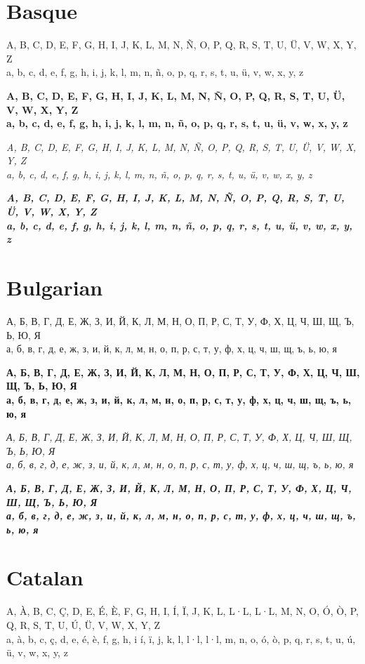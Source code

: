 \documentclass[12pt]{article}
\begin{document}
\section{Basque}
A, B, C, D, E, F, G, H, I, J, K, L, M, N, Ñ, O, P, Q, R, S, T, U, Ü, V, W, X, Y, Z \\
a, b, c, d, e, f, g, h, i, j, k, l, m, n, ñ, o, p, q, r, s, t, u, ü, v, w, x, y, z

\textbf {
A, B, C, D, E, F, G, H, I, J, K, L, M, N, Ñ, O, P, Q, R, S, T, U, Ü, V, W, X, Y, Z \\
a, b, c, d, e, f, g, h, i, j, k, l, m, n, ñ, o, p, q, r, s, t, u, ü, v, w, x, y, z
}

\textit{
A, B, C, D, E, F, G, H, I, J, K, L, M, N, Ñ, O, P, Q, R, S, T, U, Ü, V, W, X, Y, Z \\
a, b, c, d, e, f, g, h, i, j, k, l, m, n, ñ, o, p, q, r, s, t, u, ü, v, w, x, y, z
}

\textbf{\textit{
A, B, C, D, E, F, G, H, I, J, K, L, M, N, Ñ, O, P, Q, R, S, T, U, Ü, V, W, X, Y, Z \\
a, b, c, d, e, f, g, h, i, j, k, l, m, n, ñ, o, p, q, r, s, t, u, ü, v, w, x, y, z
}}


\section{Bulgarian}
А, Б, В, Г, Д, Е, Ж, З, И, Й, К, Л, М, Н, О, П, Р, С, Т, У, Ф, Х, Ц, Ч, Ш, Щ, Ъ, Ь, Ю, Я \\
а, б, в, г, д, е, ж, з, и, й, к, л, м, н, о, п, р, с, т, у, ф, х, ц, ч, ш, щ, ъ, ь, ю, я

\textbf{
А, Б, В, Г, Д, Е, Ж, З, И, Й, К, Л, М, Н, О, П, Р, С, Т, У, Ф, Х, Ц, Ч, Ш, Щ, Ъ, Ь, Ю, Я \\
а, б, в, г, д, е, ж, з, и, й, к, л, м, н, о, п, р, с, т, у, ф, х, ц, ч, ш, щ, ъ, ь, ю, я
}

\textit{
А, Б, В, Г, Д, Е, Ж, З, И, Й, К, Л, М, Н, О, П, Р, С, Т, У, Ф, Х, Ц, Ч, Ш, Щ, Ъ, Ь, Ю, Я \\
а, б, в, г, д, е, ж, з, и, й, к, л, м, н, о, п, р, с, т, у, ф, х, ц, ч, ш, щ, ъ, ь, ю, я
}

\textbf{\textit{
А, Б, В, Г, Д, Е, Ж, З, И, Й, К, Л, М, Н, О, П, Р, С, Т, У, Ф, Х, Ц, Ч, Ш, Щ, Ъ, Ь, Ю, Я \\
а, б, в, г, д, е, ж, з, и, й, к, л, м, н, о, п, р, с, т, у, ф, х, ц, ч, ш, щ, ъ, ь, ю, я
}}


\clearpage
\section{Catalan}
A, À, B, C, Ç, D, E, É, È, F, G, H, I, Í, Ï, J, K, L, L·L, L·L, M, N, O, Ó, Ò, P, Q, R, S, T, U, Ú, Ü, V, W, X, Y, Z \\
a, à, b, c, ç, d, e, é, è, f, g, h, i í, ï, j, k, l, l·l, l·l, m, n, o, ó, ò, p, q, r, s, t, u, ú, ü, v, w, x, y, z
\end{document}
